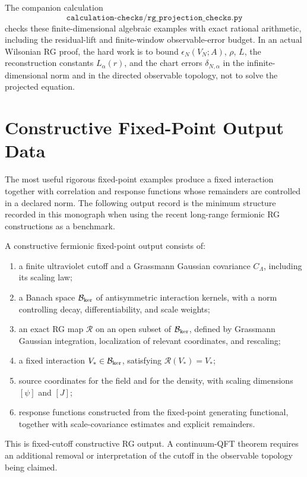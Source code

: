 The companion calculation
\[
  \texttt{calculation-checks/rg\_projection\_checks.py}
\]
checks these finite-dimensional algebraic examples with exact rational
arithmetic, including the residual-lift and finite-window observable-error
budget.  In an actual Wilsonian RG proof, the hard work is to bound
\(\epsilon_N(V_N;A)\), \(\rho\), \(L\), the reconstruction constants
\(L_\alpha(r)\), and the chart errors \(\delta_{N,\alpha}\) in the
infinite-dimensional norm and in the directed observable topology, not to
solve the projected equation.

\section{Constructive Fixed-Point Output Data}

The most useful rigorous fixed-point examples produce a fixed interaction
together with correlation and response functions whose remainders are
controlled in a
declared norm.  The following output record is the minimum structure recorded in this
monograph when using the recent long-range fermionic RG constructions as a
benchmark.

\begin{definition}
\label{def:constructive-fermionic-fixed-point-output}
A constructive fermionic fixed-point output consists of:
\begin{enumerate}
  \item a finite ultraviolet cutoff and a Grassmann Gaussian covariance
  \(C_\Lambda\), including its scaling law;
  \item a Banach space \(\mathcal B_{\rm ker}\) of antisymmetric interaction
  kernels, with a norm controlling decay, differentiability, and scale
  weights;
  \item an exact RG map \(\mathcal R\) on an open subset of
  \(\mathcal B_{\rm ker}\), defined by Grassmann Gaussian integration,
  localization of relevant coordinates, and rescaling;
  \item a fixed interaction \(V_\ast\in\mathcal B_{\rm ker}\), satisfying
  \(\mathcal R(V_\ast)=V_\ast\);
  \item source coordinates for the field and for the density, with scaling
  dimensions \([\psi]\) and \([J]\);
  \item response functions constructed from the fixed-point generating
  functional, together with scale-covariance estimates and explicit
  remainders.
\end{enumerate}
This is fixed-cutoff constructive RG output.  A continuum-QFT theorem
requires an additional removal or interpretation of the cutoff in the
observable topology being claimed.
\end{definition}

